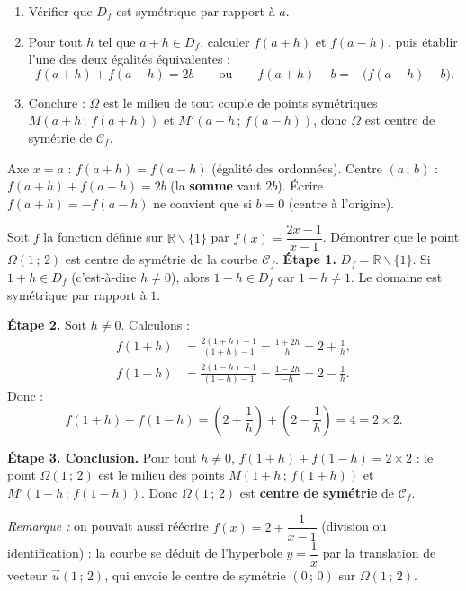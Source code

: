 \documentclass[11pt]{article}
\def\setminus{\mathbin{\backslash}}\let\smallsetminus\setminus
\begin{document}
\begin{methode}
\begin{enumerate}
\item Vérifier que $D_f$ est symétrique par rapport à $a$.
\item Pour tout $h$ tel que $a+h\in D_f$, calculer $f(a+h)$ et $f(a-h)$, puis établir l'une des deux égalités équivalentes :
\[ f(a+h)+f(a-h)=2b \qquad\text{ou}\qquad f(a+h)-b = -\bigl(f(a-h)-b\bigr). \]
\item Conclure : $\Omega$ est le milieu de tout couple de points symétriques $M(a+h\,;\,f(a+h))$ et $M'(a-h\,;\,f(a-h))$, donc $\Omega$ est centre de symétrie de $\mathcal{C}_f$.
\end{enumerate}
\end{methode}

\begin{attention}
Axe $x=a$ : $f(a+h)=f(a-h)$ (égalité des ordonnées). Centre $(a\,;\,b)$ : $f(a+h)+f(a-h)=2b$ (la \textbf{somme} vaut $2b$). Écrire $f(a+h)=-f(a-h)$ ne convient que si $b=0$ (centre à l'origine).
\end{attention}

\begin{exoresolu}
Soit $f$ la fonction définie sur $\mathbb{R}\setminus\{1\}$ par $f(x)=\dfrac{2x-1}{x-1}$.
Démontrer que le point $\Omega(1\,;\,2)$ est centre de symétrie de la courbe $\mathcal{C}_f$.
\tcblower
\textbf{Étape 1.} $D_f=\mathbb{R}\setminus\{1\}$. Si $1+h\in D_f$ (c'est-à-dire $h\neq 0$), alors $1-h\in D_f$ car $1-h\neq 1$. Le domaine est symétrique par rapport à $1$.

\textbf{Étape 2.} Soit $h\neq 0$. Calculons :
\begin{align*}
f(1+h) &= \frac{2(1+h)-1}{(1+h)-1} = \frac{1+2h}{h} = 2 + \frac{1}{h},\\[2pt]
f(1-h) &= \frac{2(1-h)-1}{(1-h)-1} = \frac{1-2h}{-h} = 2 - \frac{1}{h}.
\end{align*}
Donc :
\[ f(1+h)+f(1-h) = \left(2+\frac{1}{h}\right)+\left(2-\frac{1}{h}\right) = 4 = 2\times 2. \]

\textbf{Étape 3. Conclusion.} Pour tout $h\neq 0$, $f(1+h)+f(1-h)=2\times 2$ : le point $\Omega(1\,;\,2)$ est le milieu des points $M(1+h\,;\,f(1+h))$ et $M'(1-h\,;\,f(1-h))$. Donc $\Omega(1\,;\,2)$ est \textbf{centre de symétrie} de $\mathcal{C}_f$.

\emph{Remarque :} on pouvait aussi réécrire $f(x)=2+\dfrac{1}{x-1}$ (division ou identification) : la courbe se déduit de l'hyperbole $y=\dfrac1x$ par la translation de vecteur $\vec{u}(1\,;\,2)$, qui envoie le centre de symétrie $(0\,;\,0)$ sur $\Omega(1\,;\,2)$.
\end{exoresolu}
\end{document}
